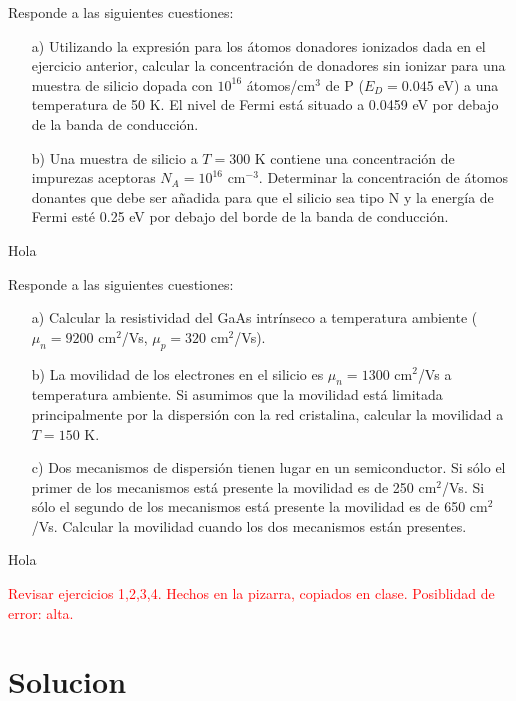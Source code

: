 \begin{texercise}
	Responde a las siguientes cuestiones: 

	\begin{enumerate}
  	  \item[a)] Utilizando la expresión para los átomos donadores ionizados dada en el ejercicio anterior, calcular la concentración de donadores sin ionizar para una muestra de silicio dopada con $10^{16}$ átomos/cm$^3$ de P ($E_D = 0.045$ eV) a una temperatura de 50 K. El nivel de Fermi está situado a 0.0459 eV por debajo de la banda de conducción.
    
   	 \item[b)] Una muestra de silicio a $T = 300$ K contiene una concentración de impurezas aceptoras $N_A = 10^{16}$ cm$^{-3}$. Determinar la concentración de átomos donantes que debe ser añadida para que el silicio sea tipo N y la energía de Fermi esté 0.25 eV por debajo del borde de la banda de conducción.
	\end{enumerate}
	
	\tcblower
	Hola
\end{texercise}


\begin{texercise}
	Responde a las siguientes cuestiones: 
	\begin{enumerate}
		\item[a)] Calcular la resistividad del GaAs intrínseco a temperatura ambiente ($\mu_n = 9200$ cm$^2$/Vs, $\mu_p = 320$ cm$^2$/Vs).
		
		\item[b)] La movilidad de los electrones en el silicio es $\mu_n = 1300$ cm$^2$/Vs a temperatura ambiente. Si asumimos que la movilidad está limitada principalmente por la dispersión con la red cristalina, calcular la movilidad a $T= 150$ K.
		
		\item[c)] Dos mecanismos de dispersión tienen lugar en un semiconductor. Si sólo el primer de los mecanismos está presente la movilidad es de 250 cm$^2$/Vs. Si sólo el segundo de los mecanismos está presente la movilidad es de 650 cm$^2$/Vs. Calcular la movilidad cuando los dos mecanismos están presentes.
	\end{enumerate}
	
	\tcblower
	Hola
\end{texercise}


\tcbstoprecording

\begin{Anotacion}
	\textcolor{red}{Revisar ejercicios 1,2,3,4. Hechos en la pizarra, copiados en clase. Posiblidad de error: alta.}
\end{Anotacion}

\section{Solucion}

\tcbinputrecords






